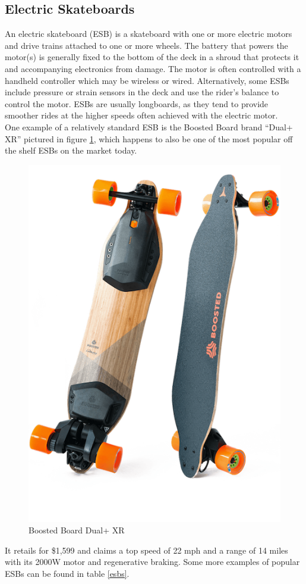 \documentclass[titlepage, letterpaper,12pt]{article}
\begin{document}
\subsection{Electric Skateboards}
An electric skateboard (ESB) is a skateboard with one or more electric motors and drive trains attached to one or more wheels. The battery that powers the motor(s) is generally fixed to the bottom of the deck in a shroud that protects it and accompanying electronics from damage. The motor is often controlled with a handheld controller which may be wireless or wired. Alternatively, some ESBs include pressure or strain sensors in the deck and use the rider's balance to control the motor. ESBs are usually longboards, as they tend to provide smoother rides at the higher speeds often achieved with the electric motor.\\
One example of a relatively standard ESB is the Boosted Board brand “Dual+ XR” pictured in figure \ref{boosted}, which happens to also be one of the most popular off the shelf ESBs on the market today.
\begin{figure}[!htbp]\centering
\includegraphics[width=.3\textwidth]{boosted.png}
\caption{Boosted Board Dual+ XR}
\label{boosted}
\end{figure}
It retails for \$1,599 and claims a top speed of 22 mph and a range of 14 miles with its 2000W motor and regenerative braking. Some more examples of popular ESBs can be found in table \ref{esbs}.
\begin{table}[!htbp]
\caption{Popular ESBs on the Market}
\label{esbs}
\end{table}
\end{document}
